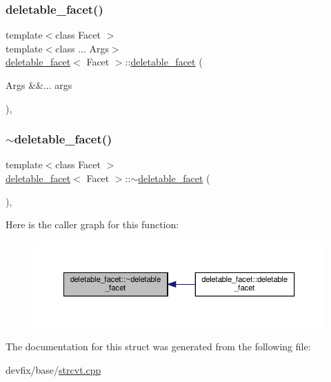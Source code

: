 \subsubsection{\texorpdfstring{deletable\+\_\+facet()}{deletable\_facet()}}
{\footnotesize\ttfamily template$<$class Facet $>$ \\
template$<$class ... Args$>$ \\
\hyperlink{structdeletable__facet}{deletable\+\_\+facet}$<$ Facet $>$\+::\hyperlink{structdeletable__facet}{deletable\+\_\+facet} (\begin{DoxyParamCaption}\item[{Args \&\&...}]{args }\end{DoxyParamCaption})\hspace{0.3cm}{\ttfamily [inline]}, {\ttfamily [explicit]}}

\mbox{\label{structdeletable__facet_a9a87be8442c76d1035d3489913789b71}} 
\subsubsection{\texorpdfstring{$\sim$deletable\+\_\+facet()}{~deletable\_facet()}}
{\footnotesize\ttfamily template$<$class Facet $>$ \\
\hyperlink{structdeletable__facet}{deletable\+\_\+facet}$<$ Facet $>$\+::$\sim$\hyperlink{structdeletable__facet}{deletable\+\_\+facet} (\begin{DoxyParamCaption}{ }\end{DoxyParamCaption})\hspace{0.3cm}{\ttfamily [override]}, {\ttfamily [default]}}

Here is the caller graph for this function\+:
\nopagebreak
\begin{figure}[H]
\begin{center}
\leavevmode
\includegraphics[width=350pt]{structdeletable__facet_a9a87be8442c76d1035d3489913789b71_icgraph}
\end{center}
\end{figure}


The documentation for this struct was generated from the following file\+:\begin{DoxyCompactItemize}
\item 
devfix/base/\hyperlink{strcvt_8cpp}{strcvt.\+cpp}\end{DoxyCompactItemize}
